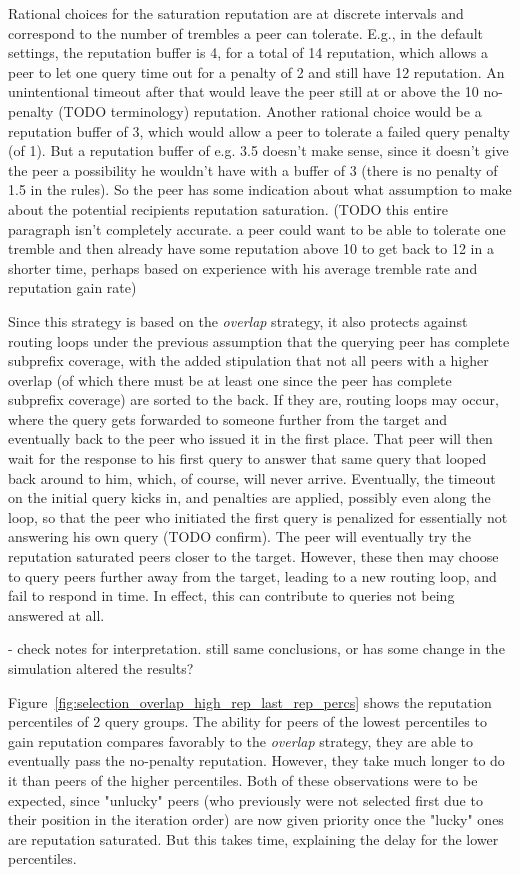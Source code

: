 Rational choices for the saturation reputation are at discrete intervals and
correspond to the number of trembles a peer can tolerate. E.g., in the default
settings, the reputation buffer is 4, for a total of 14 reputation, which allows
a peer to let one query time out for a penalty of 2 and still have 12
reputation. An unintentional timeout after that would leave the peer still at or
above the 10 no-penalty (TODO terminology) reputation. Another rational choice
would be a reputation buffer of 3, which would allow a peer to tolerate a failed
query penalty (of 1). But a reputation buffer of e.g. 3.5 doesn't make sense,
since it doesn't give the peer a possibility he wouldn't have with a buffer of
3 (there is no penalty of 1.5 in the rules). So the peer has some indication
about what assumption to make about the potential recipients reputation
saturation. (TODO this entire paragraph isn't completely accurate. a peer could
want to be able to tolerate one tremble and then already have some reputation
above 10 to get back to 12 in a shorter time, perhaps based on experience with
his average tremble rate and reputation gain rate)

Since this strategy is based on the \emph{overlap} strategy, it also protects
against routing loops under the previous assumption that the querying peer has
complete subprefix coverage, with the added stipulation that not all peers with
a higher overlap (of which there must be at least one since the peer has
complete subprefix coverage) are sorted to the back. If they are, routing loops
may occur, where the query gets forwarded to someone further from the target and
eventually back to the peer who issued it in the first place. That peer will
then wait for the response to his first query to answer that same query that
looped back around to him, which, of course, will never arrive. Eventually, the
timeout on the initial query kicks in, and penalties are applied, possibly even
along the loop, so that the peer who initiated the first query is penalized for
essentially not answering his own query (TODO confirm). The peer will eventually
try the reputation saturated peers closer to the target. However, these then may
choose to query peers further away from the target, leading to a new routing
loop, and fail to respond in time. In effect, this can contribute to queries not
being answered at all.

- check notes for interpretation. still same conclusions, or has some change in
  the simulation altered the results?

Figure~\ref{fig:selection_overlap_high_rep_last_rep_percs} shows the reputation
percentiles of 2 query groups. The ability for peers of the lowest percentiles
to gain reputation compares favorably to the \emph{overlap} strategy, they are
able to eventually pass the no-penalty reputation. However, they take much
longer to do it than peers of the higher percentiles. Both of these observations
were to be expected, since "unlucky" peers (who previously were not selected
first due to their position in the iteration order) are now given priority once
the "lucky" ones are reputation saturated. But this takes time, explaining the
delay for the lower percentiles.

